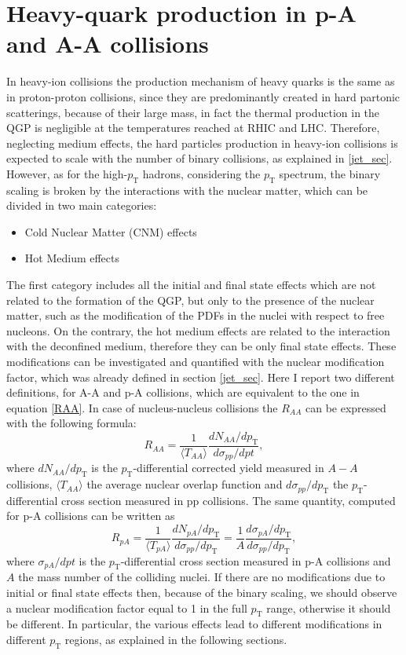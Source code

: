 \documentclass[b5paper,10pt,twoside,oldstyle,classica]{toptesi}
\newcommand{\pt}{p_\text{T}}
\begin{document}
\section{Heavy-quark production in p-A and A-A collisions}
In heavy-ion collisions the production mechanism of heavy quarks is the same as in proton-proton collisions, since they are predominantly created in hard partonic scatterings, because of their large mass, in fact the thermal production in the QGP is negligible at the temperatures reached at RHIC and LHC. Therefore, neglecting medium effects, the hard particles production in heavy-ion collisions is expected to scale with the number of binary collisions, as explained in \ref{jet_sec}.
However, as for the high-$\pt$ hadrons, considering the $\pt$ spectrum, the binary scaling is broken by the interactions with the nuclear matter, which can be divided in two main categories:
\begin{itemize}
 \item Cold Nuclear Matter (CNM) effects 
 \item Hot Medium effects
\end{itemize}
The first category includes all the initial and final state effects which are not related to the formation of the QGP, but only to the presence of the nuclear matter, such as the modification of the PDFs in the nuclei with respect to free nucleons. On the contrary, the hot medium effects are related to the interaction with the deconfined medium, therefore they can be only final state effects. 
These modifications can be investigated and quantified with the nuclear modification factor, which was already defined in section \ref{jet_sec}. Here I report two different definitions, for A-A and p-A collisions, which are equivalent to the one in equation \ref{RAA}.
In case of nucleus-nucleus collisions the $R_{AA}$ can be expressed with the following formula: 
\begin{equation}
 R_{AA} = \frac{1}{\langle T_{AA} \rangle} \frac{dN_{AA}/d\pt}{d\sigma_{pp}/dpt},
 \label{RAA_HF}
\end{equation}
where $dN_{AA}/d\pt$ is the $\pt$-differential corrected yield measured in $A-A$ collisions, $\langle T_{AA} \rangle$ the average nuclear overlap function and $d\sigma_{pp}/d\pt$ the $\pt$-differential cross section measured in pp collisions. The same quantity, computed for p-A collisions can be written as
\begin{equation}
 R_{pA} = \frac{1}{\langle T_{pA} \rangle} \frac{dN_{pA}/d\pt}{d\sigma_{pp}/d\pt} = \frac{1}{A} \frac{d\sigma_{pA}/d\pt}{d\sigma_{pp}/d\pt},
 \label{RpA_HF}
\end{equation}
where $\sigma_{pA}/dpt$ is the $\pt$-differential cross section measured in p-A collisions and $A$ the mass number of the colliding nuclei. If there are no modifications due to initial or final state effects then, because of the binary scaling, we should observe a nuclear modification factor equal to 1 in the full $\pt$ range, otherwise it should be different. In particular, the various effects lead to different modifications in different $\pt$ regions, as explained in the following sections.
\end{document}
